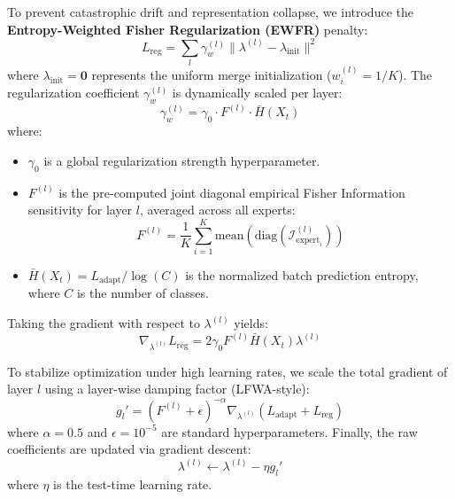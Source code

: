 \documentclass{article}
\theoremstyle{plain}
\theoremstyle{definition}
\theoremstyle{remark}
\begin{document}
To prevent catastrophic drift and representation collapse, we introduce the \textbf{Entropy-Weighted Fisher Regularization (EWFR)} penalty:
\begin{equation}
    L_{\text{reg}} = \sum_{l} \gamma_w^{(l)} \| \lambda^{(l)} - \lambda_{\text{init}} \|^2
\end{equation}
where $\lambda_{\text{init}} = \mathbf{0}$ represents the uniform merge initialization ($w_i^{(l)} = 1/K$). The regularization coefficient $\gamma_w^{(l)}$ is dynamically scaled per layer:
\begin{equation}
    \gamma_w^{(l)} = \gamma_0 \cdot F^{(l)} \cdot \bar{H}(X_t)
\end{equation}
where:
\begin{itemize}
    \item $\gamma_0$ is a global regularization strength hyperparameter.
    \item $F^{(l)}$ is the pre-computed joint diagonal empirical Fisher Information sensitivity for layer $l$, averaged across all experts:
    \begin{equation}
        F^{(l)} = \frac{1}{K} \sum_{i=1}^K \text{mean}\left( \text{diag}(\mathcal{I}_{\text{expert}_i}^{(l)}) \right)
    \end{equation}
    \item $\bar{H}(X_t) = L_{\text{adapt}} / \log(C)$ is the normalized batch prediction entropy, where $C$ is the number of classes.
\end{itemize}

Taking the gradient with respect to $\lambda^{(l)}$ yields:
\begin{equation}
    \nabla_{\lambda^{(l)}} L_{\text{reg}} = 2 \gamma_0 F^{(l)} \bar{H}(X_t) \lambda^{(l)}
\end{equation}

To stabilize optimization under high learning rates, we scale the total gradient of layer $l$ using a layer-wise damping factor (LFWA-style):
\begin{equation}
    g_{l}' = (F^{(l)} + \epsilon)^{-\alpha} \nabla_{\lambda^{(l)}} (L_{\text{adapt}} + L_{\text{reg}})
\end{equation}
where $\alpha=0.5$ and $\epsilon=10^{-5}$ are standard hyperparameters. Finally, the raw coefficients are updated via gradient descent:
\begin{equation}
    \lambda^{(l)} \leftarrow \lambda^{(l)} - \eta g_{l}'
\end{equation}
where $\eta$ is the test-time learning rate.
\end{document}
